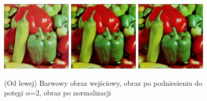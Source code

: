 \documentclass[final,a4paper,openany,12pt]{mwbk}
\begin{document}
\begin{figure}[H]
	\begin{center}
		\includegraphics[width=0.3\textwidth]{1/1Color_Pow_Original}
		\includegraphics[width=0.3\textwidth]{1/1Color_Pow_Result}
		\includegraphics[width=0.3\textwidth]{1/1Color_Pow_Result_Norm}
	\end{center}
	\caption{(Od lewej) Barwowy obraz wejściowy, obraz po podniesieniu do potęgi $\alpha$=2, obraz po normalizacji }
\end{figure}
\end{document}
